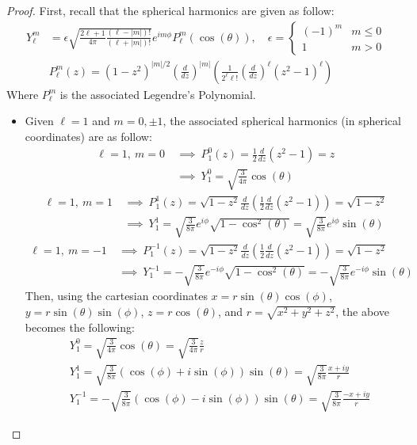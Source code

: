 \documentclass{article}
\begin{document}
\begin{proof}
    First, recall that the spherical harmonics are given as follow:
    \begin{align}
        Y_\ell^m &= \epsilon\sqrt{\frac{2\ell+1}{4\pi}\frac{(\ell-|m|)!}{(\ell+|m|)!}}e^{im\phi}P_\ell^m(\cos(\theta)),\quad \epsilon=\begin{cases}
            (-1)^m & m\leq 0\\
            1 & m>0
        \end{cases}\\
        &P_\ell^m(z) = (1-z^2)^{|m|/2}\left(\frac{d}{dz}\right)^{|m|}\left(\frac{1}{2^\ell \ell!}\left(\frac{d}{dz}\right)^\ell(z^2-1)^\ell\right)
    \end{align}
    Where $P_\ell^m$ is the associated Legendre's Polynomial.

    \hfil

    \begin{itemize}
        \item[(a)] Given $\ell=1$ and $m = 0,\pm 1$, the associated spherical harmonics (in spherical coordinates) are as follow:
        \begin{align}
            \ell=1,\ m = 0 \ &\implies\  P_1^0 (z) = \frac{1}{2}\frac{d}{dz}(z^2-1) = z\\
            &\implies \ Y_1^0 = \sqrt{\frac{3}{4\pi}}\cos(\theta)
        \end{align}
        \begin{align}
            \ell=1,\ m=1\ &\implies\ P_1^1(z) = \sqrt{1-z^2}\frac{d}{dz}\left(\frac{1}{2}\frac{d}{dz}(z^2-1)\right) = \sqrt{1-z^2}\\
            &\implies \ Y_1^1 = \sqrt{\frac{3}{8\pi}}e^{i\phi}\sqrt{1-\cos^2(\theta)} = \sqrt{\frac{3}{8\pi}}e^{i\phi}\sin(\theta)
        \end{align}
        \begin{align}
            \ell=1,\ m=-1\ &\implies\ P_1^{-1}(z) = \sqrt{1-z^2}\frac{d}{dz}\left(\frac{1}{2}\frac{d}{dz}(z^2-1)\right) = \sqrt{1-z^2}\\
            &\implies\ Y_1^{-1} = -\sqrt{\frac{3}{8\pi}}e^{-i\phi}\sqrt{1-\cos^2(\theta)}=-\sqrt{\frac{3}{8\pi}}e^{-i\phi}\sin(\theta)
        \end{align}
        Then, using the cartesian coordinates $x = r\sin(\theta)\cos(\phi)$, $y=r\sin(\theta)\sin(\phi)$, $z=r\cos(\theta)$, and $r = \sqrt{x^2+y^2+z^2}$, the above becomes the following:
        \begin{align}
            &Y^0_1 = \sqrt{\frac{3}{4\pi}}\cos(\theta) = \sqrt{\frac{3}{4\pi}}\frac{z}{r}\\
            &Y_1^1 = \sqrt{\frac{3}{8\pi}}(\cos(\phi)+i\sin(\phi))\sin(\theta) = \sqrt{\frac{3}{8\pi}}\frac{x+iy}{r}\\
            &Y_1^{-1} = -\sqrt{\frac{3}{8\pi}}(\cos(\phi)-i\sin(\phi))\sin(\theta) = \sqrt{\frac{3}{8\pi}}\frac{-x+iy}{r}
        \end{align}


\end{itemize}
\end{proof}
\end{document}

